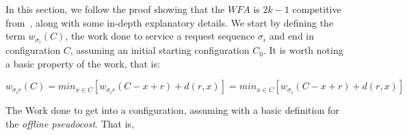 In this section, we follow the proof showing that the $WFA$ is $2k-1$ competitive from~\cite{OnlineComp1998}, along with some in-depth explanatory details. We start by defining the term $w_{\sigma_i}(C)$, the work done to service a request sequence $\sigma_i$ and end in configuration $C$, assuming an initial starting configuration $C_0$. It is worth noting a basic property of the work, that is:

\begin{equation*}
    \label{eq:work}
    w_{\sigma_i r}(C) = min_{x \in C} [w_{\sigma_{i} r}(C - x + r) + d(r, x)] = min_{x \in C} [w_{\sigma_{i}}(C - x + r) + d(r, x)]
\end{equation*}

The Work done to get into a configuration, assuming with a basic definition for the \textit{offline pseudocost}. That is, 


